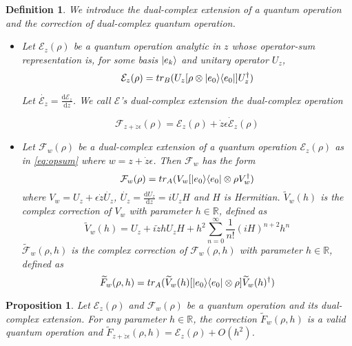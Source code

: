 \documentclass{article}
\newtheorem{definition}[theorem]{Definition}
\newtheorem{proposition}[theorem]{Proposition}
\newcommand{\R}{\mathbb{R}}
\newcommand{\e}{\epsilon}
\newcommand{\E}{\mathcal{E}}
\newcommand{\F}{\mathcal{F}}
\newcommand{\til}{\widetilde}
\newcommand\ketbra[2]{\ket{#1}\!\bra{#2}}
\begin{document}
\begin{definition}\label{def:ext}
We introduce the dual-complex extension of a quantum operation and the correction of dual-complex quantum operation.
\begin{itemize}
 \item Let $\E_z(\rho)$ be a quantum operation analytic in $z$ whose operator-sum representation is, for some basis $\ket{e_k}$ and unitary operator $U_z$,
\begin{equation}\label{eq:opsum}
\E_z(\rho) = tr_B(U_z [\rho \otimes \ketbra{e_0}{e_0}] U_z^\dagger)
\end{equation}

Let $\dot{\E_z} = \frac{\mathrm{d}\E_z}{\mathrm{d}z}$. We call $\E$'s dual-complex extension the dual-complex operation

\begin{equation}
\F_{z+\dot{z}\e}(\rho) = \E_z(\rho) + \dot{z}\e \dot{\E}_z(\rho)
\end{equation}

 \item Let $\F_w(\rho)$ be a dual-complex extension of a quantum operation $\E_z(\rho)$ as in \ref{eq:opsum} where $w = z + \dot{z}\e$. Then $\F_w$ has the form
        \begin{equation}
        \F_{w}(\rho) = tr_A(V_w [ \ketbra{e_0}{e_0} \otimes \rho V_w^\dagger)
        \end{equation}
  where $V_w = U_z + \e \dot{z} \dot{U_z}$, $\dot{U_z} = \frac{\mathrm{d}U_z}{\mathrm{d}z} = iU_zH$ and $H$ is Hermitian. $\til{V}_w(h)$ is the complex correction of $V_w$ with parameter $h \in \R$, defined as
        \begin{equation}
        \til{V}_w(h) = U_z + i \dot{z} h {U_z} H + h^2\sum_{n=0}^\infty \frac{1}{n!} (iH)^{n+2}h^n
        \end{equation}
  $\til{\F}_w(\rho, h)$ is the complex correction of $\F_w(\rho, h)$ with parameter $h \in \R$, defined as
        \begin{equation}\label{eq:corrF}
        \til{F}_w(\rho, h) = tr_A(\til{V}_w(h) [ \ketbra{e_0}{e_0} \otimes \rho ] \til{V}_w(h)^\dagger)
        \end{equation}
\end{itemize}

\end{definition}

\begin{proposition}\label{pr:frbk}
Let $\E_z(\rho)$ and $\F_w(\rho)$ be a quantum operation and its dual-complex extension. For any parameter $h \in \R$, the correction $\til{F}_w(\rho, h)$ is a valid quantum operation and $\til{F}_{z + \dot{z}\e}(\rho, h) = \E_z(\rho) + O(h^2)$.
\end{proposition}
\end{document}

